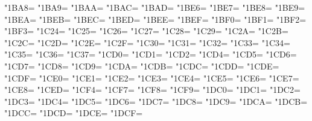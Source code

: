 \XeTeXcharclass"1BA8=\KclassCM
\XeTeXcharclass"1BA9=\KclassCM
\XeTeXcharclass"1BAA=\KclassCM
\XeTeXcharclass"1BAC=\KclassCM
\XeTeXcharclass"1BAD=\KclassCM
\XeTeXcharclass"1BE6=\KclassCM
\XeTeXcharclass"1BE7=\KclassCM
\XeTeXcharclass"1BE8=\KclassCM
\XeTeXcharclass"1BE9=\KclassCM
\XeTeXcharclass"1BEA=\KclassCM
\XeTeXcharclass"1BEB=\KclassCM
\XeTeXcharclass"1BEC=\KclassCM
\XeTeXcharclass"1BED=\KclassCM
\XeTeXcharclass"1BEE=\KclassCM
\XeTeXcharclass"1BEF=\KclassCM
\XeTeXcharclass"1BF0=\KclassCM
\XeTeXcharclass"1BF1=\KclassCM
\XeTeXcharclass"1BF2=\KclassCM
\XeTeXcharclass"1BF3=\KclassCM
\XeTeXcharclass"1C24=\KclassCM
\XeTeXcharclass"1C25=\KclassCM
\XeTeXcharclass"1C26=\KclassCM
\XeTeXcharclass"1C27=\KclassCM
\XeTeXcharclass"1C28=\KclassCM
\XeTeXcharclass"1C29=\KclassCM
\XeTeXcharclass"1C2A=\KclassCM
\XeTeXcharclass"1C2B=\KclassCM
\XeTeXcharclass"1C2C=\KclassCM
\XeTeXcharclass"1C2D=\KclassCM
\XeTeXcharclass"1C2E=\KclassCM
\XeTeXcharclass"1C2F=\KclassCM
\XeTeXcharclass"1C30=\KclassCM
\XeTeXcharclass"1C31=\KclassCM
\XeTeXcharclass"1C32=\KclassCM
\XeTeXcharclass"1C33=\KclassCM
\XeTeXcharclass"1C34=\KclassCM
\XeTeXcharclass"1C35=\KclassCM
\XeTeXcharclass"1C36=\KclassCM
\XeTeXcharclass"1C37=\KclassCM
\XeTeXcharclass"1CD0=\KclassCM
\XeTeXcharclass"1CD1=\KclassCM
\XeTeXcharclass"1CD2=\KclassCM
\XeTeXcharclass"1CD4=\KclassCM
\XeTeXcharclass"1CD5=\KclassCM
\XeTeXcharclass"1CD6=\KclassCM
\XeTeXcharclass"1CD7=\KclassCM
\XeTeXcharclass"1CD8=\KclassCM
\XeTeXcharclass"1CD9=\KclassCM
\XeTeXcharclass"1CDA=\KclassCM
\XeTeXcharclass"1CDB=\KclassCM
\XeTeXcharclass"1CDC=\KclassCM
\XeTeXcharclass"1CDD=\KclassCM
\XeTeXcharclass"1CDE=\KclassCM
\XeTeXcharclass"1CDF=\KclassCM
\XeTeXcharclass"1CE0=\KclassCM
\XeTeXcharclass"1CE1=\KclassCM
\XeTeXcharclass"1CE2=\KclassCM
\XeTeXcharclass"1CE3=\KclassCM
\XeTeXcharclass"1CE4=\KclassCM
\XeTeXcharclass"1CE5=\KclassCM
\XeTeXcharclass"1CE6=\KclassCM
\XeTeXcharclass"1CE7=\KclassCM
\XeTeXcharclass"1CE8=\KclassCM
\XeTeXcharclass"1CED=\KclassCM
\XeTeXcharclass"1CF4=\KclassCM
\XeTeXcharclass"1CF7=\KclassCM
\XeTeXcharclass"1CF8=\KclassCM
\XeTeXcharclass"1CF9=\KclassCM
\XeTeXcharclass"1DC0=\KclassCM
\XeTeXcharclass"1DC1=\KclassCM
\XeTeXcharclass"1DC2=\KclassCM
\XeTeXcharclass"1DC3=\KclassCM
\XeTeXcharclass"1DC4=\KclassCM
\XeTeXcharclass"1DC5=\KclassCM
\XeTeXcharclass"1DC6=\KclassCM
\XeTeXcharclass"1DC7=\KclassCM
\XeTeXcharclass"1DC8=\KclassCM
\XeTeXcharclass"1DC9=\KclassCM
\XeTeXcharclass"1DCA=\KclassCM
\XeTeXcharclass"1DCB=\KclassCM
\XeTeXcharclass"1DCC=\KclassCM
\XeTeXcharclass"1DCD=\KclassCM
\XeTeXcharclass"1DCE=\KclassCM
\XeTeXcharclass"1DCF=\KclassCM
